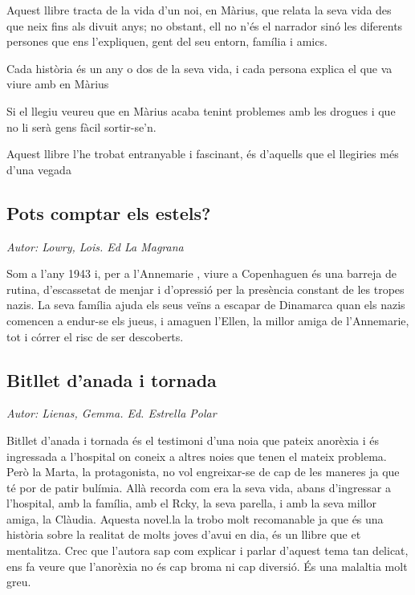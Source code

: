 \begin{news}
Aquest llibre tracta de la vida d’un noi, en Màrius, que relata la seva vida des que neix fins als divuit anys; no obstant, ell no n’és el narrador sinó les diferents persones que ens l’expliquen, gent del seu entorn, família i amics.

Cada història és un any o dos de la seva vida, i cada persona explica el que va viure amb en Màrius

Si el llegiu veureu que en Màrius acaba tenint problemes amb les drogues i que no li serà gens fàcil sortir-se’n.

Aquest llibre l’he trobat entranyable i fascinant, és d’aquells que el llegiries més d’una vegada




\subsection*{Pots comptar els estels?}
\emph{Autor: Lowry, Lois. Ed La Magrana}

Som a l’any 1943 i, per a l’Annemarie , viure a Copenhaguen és una barreja de rutina, d’escassetat de menjar i d’opressió per la presència constant de les tropes nazis.
La seva família ajuda els seus veïns a escapar de Dinamarca quan els nazis comencen a endur-se els jueus, i amaguen l’Ellen, la millor amiga de l’Annemarie, tot i córrer el risc de ser descoberts.


\subsection*{Bitllet d’anada i tornada}

\emph{Autor: Lienas, Gemma. Ed. Estrella Polar}

Bitllet d’anada i tornada és el testimoni d’una noia que pateix anorèxia i és ingressada a l’hospital on coneix a altres noies que tenen el mateix problema. Però la Marta, la protagonista, no vol engreixar-se de cap de les maneres ja que té por de patir bulímia. Allà recorda com era la seva vida, abans d’ingressar a l’hospital, amb la família, amb el Rcky, la seva parella, i amb la seva millor amiga, la Clàudia.
Aquesta novel.la la trobo molt recomanable ja que és una història sobre la realitat de molts joves d’avui en dia, és un llibre que et mentalitza. Crec que l’autora sap com explicar i parlar d’aquest tema tan delicat, ens fa veure que l’anorèxia no és cap broma ni cap diversió. És una malaltia molt greu. 


\end{news}
